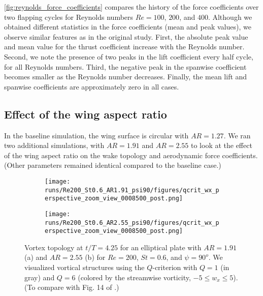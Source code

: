 \cref{fig:reynolds_force_coefficients} compares the history of the force coefficients over two flapping cycles for Reynolds numbers $Re = 100$, $200$, and $400$.
Although we obtained different statistics in the force coefficients (mean and peak values), we observe similar features as in the original study.
First, the absolute peak value and mean value for the thrust coefficient increase with the Reynolds number.
Second, we note the presence of two peaks in the lift coefficient every half cycle, for all Reynolds numbers.
Third, the negative peak in the spanwise coefficient becomes smaller as the Reynolds number decreases.
Finally, the mean lift and spanwise coefficients are approximately zero in all cases.

\subsection{Effect of the wing aspect ratio}

In the baseline simulation, the wing surface is circular with $AR = 1.27$.
We ran two additional simulations, with $AR = 1.91$ and $AR = 2.55$ to look at the effect of the wing aspect ratio on the wake topology and aerodynamic force coefficients.
(Other parameters remained identical compared to the baseline case.)

\begin{figure}
  \centering
  \begin{subfigure}[c]{0.45\textwidth}
    \centering
    \texttt{[image: runs/Re200\_St0.6\_AR1.91\_psi90/figures/qcrit\_wx\_perspective\_zoom\_view\_0008500\_post.png]}
    \caption{}
    \label{fig:ratio_wake_topology:1.91_perspective}
  \end{subfigure}
  \hfill
  \begin{subfigure}[c]{0.45\textwidth}
    \centering
    \texttt{[image: runs/Re200\_St0.6\_AR2.55\_psi90/figures/qcrit\_wx\_perspective\_zoom\_view\_0008500\_post.png]}
    \caption{}
    \label{fig:ratio_wake_topology:2.55_perspective}
  \end{subfigure}
  \caption{Vortex topology at $t / T = 4.25$ for an elliptical plate with $AR = 1.91$ (a) and $AR = 2.55$ (b) for $Re = 200$, $St = 0.6$, and $\psi = 90^o$. We visualized vortical structures using the $Q$-criterion with $Q = 1$ (in gray) and $Q = 6$ (colored by the streamwise vorticity, $-5 \leq w_x \leq 5$). (To compare with Fig. 14 of \citet{li_dong_2016}.)}
  \label{fig:ratio_wake_topology}
\end{figure}

